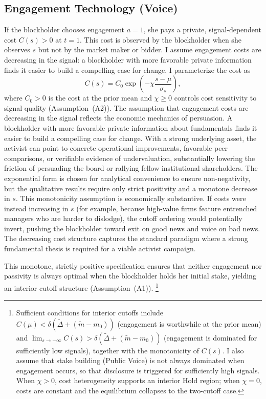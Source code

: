 \documentclass[11pt]{article}
\newcommand{\1}{\mathbf{1}}
\begin{document}
%
\subsection{Engagement Technology (Voice)}
\label{sec:engagement}
%

If the blockholder chooses engagement $a = 1$, she pays a private, signal-dependent cost $C(s) > 0$ at $t = 1$. This cost is observed by the blockholder when she observes $s$ but not by the market maker or bidder. I assume engagement costs are decreasing in the signal: a blockholder with more favorable private information finds it easier to build a compelling case for change. I parameterize the cost as
\[
C(s) = C_0 \exp\!\left(-\chi \frac{s - \mu}{\sigma_s}\right),
\]
where $C_0 > 0$ is the cost at the prior mean and $\chi \geq 0$ controls cost sensitivity to signal quality (Assumption~\textup{(A2)}). The assumption that engagement costs are decreasing in the signal reflects the economic mechanics of persuasion. A blockholder with more favorable private information about fundamentals finds it easier to build a compelling case for change. With a strong underlying asset, the activist can point to concrete operational improvements, favorable peer comparisons, or verifiable evidence of undervaluation, substantially lowering the friction of persuading the board or rallying fellow institutional shareholders. The exponential form is chosen for analytical convenience to ensure non-negativity, but the qualitative results require only strict positivity and a monotone decrease in $s$. This monotonicity assumption is economically substantive. If costs were instead increasing in $s$ (for example, because high-value firms feature entrenched managers who are harder to dislodge), the cutoff ordering would potentially invert, pushing the blockholder toward exit on good news and voice on bad news. The decreasing cost structure captures the standard paradigm where a strong fundamental thesis is required for a viable activist campaign.

This monotone, strictly positive specification ensures that neither engagement nor passivity is always optimal when the blockholder holds her initial stake, yielding an interior cutoff structure (Assumption~\textup{(A1)}).%
\footnote{Sufficient conditions for interior cutoffs include $C(\mu) < \delta(\tilde{\Delta} + (\tilde{m}-m_0))$ (engagement is worthwhile at the prior mean) and $\lim_{s\to-\infty} C(s) > \delta(\tilde{\Delta} + (\tilde{m}-m_0))$ (engagement is dominated for sufficiently low signals), together with the monotonicity of $C(s)$. I also assume that stake building (Public Voice) is not always dominated when engagement occurs, so that disclosure is triggered for sufficiently high signals. When $\chi > 0$, cost heterogeneity supports an interior Hold region; when $\chi = 0$, costs are constant and the equilibrium collapses to the two-cutoff case.}
\end{document}
